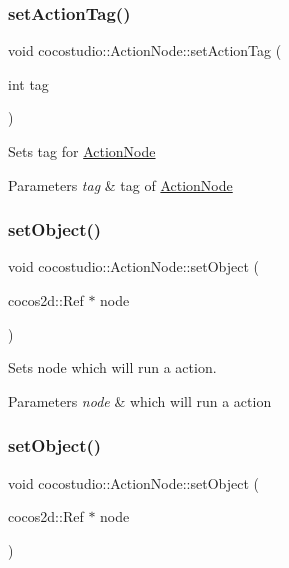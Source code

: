 \subsubsection{\texorpdfstring{set\+Action\+Tag()}{setActionTag()}\hspace{0.1cm}{\footnotesize\ttfamily [2/2]}}
{\footnotesize\ttfamily void cocostudio\+::\+Action\+Node\+::set\+Action\+Tag (\begin{DoxyParamCaption}\item[{int}]{tag }\end{DoxyParamCaption})}

Sets tag for \hyperlink{classcocostudio_1_1ActionNode}{Action\+Node}


\begin{DoxyParams}{Parameters}
{\em tag} & tag of \hyperlink{classcocostudio_1_1ActionNode}{Action\+Node} \\
\hline
\end{DoxyParams}
\mbox{\label{classcocostudio_1_1ActionNode_a77ead6b033989a2e51daf494baa6df86}} 
\subsubsection{\texorpdfstring{set\+Object()}{setObject()}\hspace{0.1cm}{\footnotesize\ttfamily [1/2]}}
{\footnotesize\ttfamily void cocostudio\+::\+Action\+Node\+::set\+Object (\begin{DoxyParamCaption}\item[{cocos2d\+::\+Ref $\ast$}]{node }\end{DoxyParamCaption})}

Sets node which will run a action.


\begin{DoxyParams}{Parameters}
{\em node} & which will run a action \\
\hline
\end{DoxyParams}
\mbox{\label{classcocostudio_1_1ActionNode_a77ead6b033989a2e51daf494baa6df86}} 
\subsubsection{\texorpdfstring{set\+Object()}{setObject()}\hspace{0.1cm}{\footnotesize\ttfamily [2/2]}}
{\footnotesize\ttfamily void cocostudio\+::\+Action\+Node\+::set\+Object (\begin{DoxyParamCaption}\item[{cocos2d\+::\+Ref $\ast$}]{node }\end{DoxyParamCaption})}

